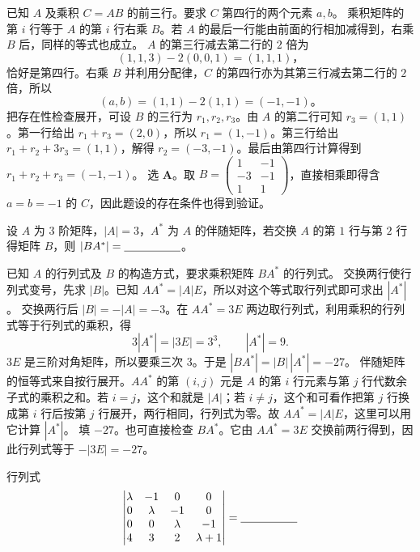 \documentclass[UTF8,zihao=-4,fontset=fandol]{ctexart}
\begin{document}
\Solution
\Known 已知 $A$ 及乘积 $C=AB$ 的前三行。要求 $C$ 第四行的两个元素 $a,b$。
\Method 乘积矩阵的第 $i$ 行等于 $A$ 的第 $i$ 行右乘 $B$。若 $A$ 的最后一行能由前面的行相加减得到，右乘 $B$ 后，同样的等式也成立。
\Derive $A$ 的第三行减去第二行的 $2$ 倍为
\[
(1,1,3)-2(0,0,1)=(1,1,1)\text{，}
\]
恰好是第四行。右乘 $B$ 并利用分配律，$C$ 的第四行亦为其第三行减去第二行的 $2$ 倍，所以
\[
(a,b)=(1,1)-2(1,1)=(-1,-1)\text{。}
\]
把存在性检查展开，可设 $B$ 的三行为 $r_1,r_2,r_3$。由 $A$ 的第二行可知 $r_3=(1,1)$。第一行给出 $r_1+r_3=(2,0)$，所以 $r_1=(1,-1)$。第三行给出 $r_1+r_2+3r_3=(1,1)$，解得 $r_2=(-3,-1)$。最后由第四行计算得到 $r_1+r_2+r_3=(-1,-1)$。
\Verify 选 \textbf{A}。取 $B=\begin{pmatrix}1&-1\\-3&-1\\1&1\end{pmatrix}$，直接相乘即得含 $a=b=-1$ 的 $C$，因此题设的存在条件也得到验证。

设 $A$ 为 $3$ 阶矩阵，$|A|=3$，$A^*$ 为 $A$ 的伴随矩阵，若交换 $A$ 的第 $1$ 行与第 $2$ 行得矩阵 $B$，则 $|BA^*|=\underline{\hspace{5em}}$。

\Solution
\Known 已知 $A$ 的行列式及 $B$ 的构造方式，要求乘积矩阵 $BA^*$ 的行列式。
\Method 交换两行使行列式变号，先求 $|B|$。已知 $AA^*=|A|E$，所以对这个等式取行列式即可求出 $|A^*|$。
\Derive 交换两行后 $|B|=-|A|=-3$。在 $AA^*=3E$ 两边取行列式，利用乘积的行列式等于行列式的乘积，得
\[
3|A^*|=|3E|=3^3,\qquad |A^*|=9.
\]
$3E$ 是三阶对角矩阵，所以要乘三次 $3$。于是 $|BA^*|=|B|\,|A^*|=-27$。
伴随矩阵的恒等式来自按行展开。$AA^*$ 的第 $(i,j)$ 元是 $A$ 的第 $i$ 行元素与第 $j$ 行代数余子式的乘积之和。若 $i=j$，这个和就是 $|A|$；若 $i\ne j$，这个和可看作把第 $j$ 行换成第 $i$ 行后按第 $j$ 行展开，两行相同，行列式为零。故 $AA^*=|A|E$，这里可以用它计算 $|A^*|$。
\Verify 填 $\boxed{-27}$。也可直接检查 $BA^*$。它由 $AA^*=3E$ 交换前两行得到，因此行列式等于 $-|3E|=-27$。

行列式
\[
\begin{vmatrix}
\lambda&-1&0&0\\
0&\lambda&-1&0\\
0&0&\lambda&-1\\
4&3&2&\lambda+1
\end{vmatrix}
=\underline{\hspace{5em}}
\]
\end{document}
